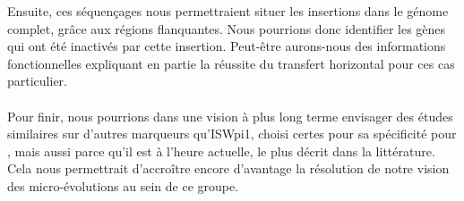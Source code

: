 Ensuite, ces séquençages nous permettraient situer les insertions dans le génome complet, grâce aux régions flanquantes. 
Nous pourrions donc identifier les gènes qui ont été inactivés par cette insertion. Peut-être aurons-nous des informations fonctionnelles expliquant en partie la réussite du transfert horizontal pour ces cas particulier.

\paragraph{} %
\label{par:vide}
Pour finir, nous pourrions dans une vision à plus long terme envisager des études similaires sur d'autres marqueurs qu'ISWpi1, choisi certes pour sa spécificité pour , mais aussi parce qu'il est à l'heure actuelle, le plus décrit dans la littérature. Cela nous permettrait d'accroître encore d'avantage la résolution de notre vision des micro-évolutions au sein de ce groupe.


